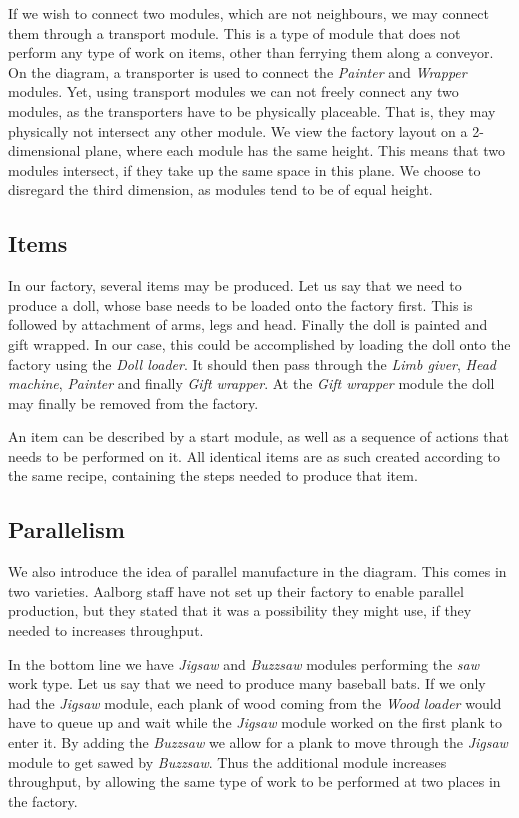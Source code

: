 If we wish to connect two modules, which are not neighbours, we may connect them through a transport module. This is a type of module that does not perform any type of work on items, other than ferrying them along a conveyor. On the diagram, a transporter is used to connect the \textit{Painter} and \textit{Wrapper} modules. Yet, using transport modules we can not freely connect any two modules, as the transporters have to be physically placeable. That is, they may physically not intersect any other module. We view the factory layout on a 2-dimensional plane, where each module has the same height. This means that two modules intersect, if they take up the same space in this plane. We choose to disregard the third dimension, as modules tend to be of equal height. 

\subsection{Items}
In our factory, several items may be produced. Let us say that we need to produce a doll, whose base needs to be loaded onto the factory first. This is followed by attachment of arms, legs and head. Finally the doll is painted and gift wrapped. In our case, this could be accomplished by loading the doll onto the factory using the \textit{Doll loader}. It should then pass through the \textit{Limb giver}, \textit{Head machine}, \textit{Painter} and finally \textit{Gift wrapper}. At the \textit{Gift wrapper} module the doll may finally be removed from the factory.

An item can be described by a start module, as well as a sequence of actions that needs to be performed on it. All identical items are as such created according to the same recipe, containing the steps needed to produce that item. 

\subsection{Parallelism}
We also introduce the idea of parallel manufacture in the diagram. This comes in two varieties. Aalborg staff have not set up their factory to enable parallel production, but they stated that it was a possibility they might use, if they needed to increases throughput.

In the bottom line we have \textit{Jigsaw} and \textit{Buzzsaw} modules performing the \textit{saw} work type. Let us say that we need to produce many baseball bats. If we only had the \textit{Jigsaw} module, each plank of wood coming from the \textit{Wood loader} would have to queue up and wait while the \textit{Jigsaw} module worked on the first plank to enter it. By adding the \textit{Buzzsaw} we allow for a plank to move through the \textit{Jigsaw} module to get sawed by \textit{Buzzsaw}. Thus the additional module increases throughput, by allowing the same type of work to be performed at two places in the factory. 

